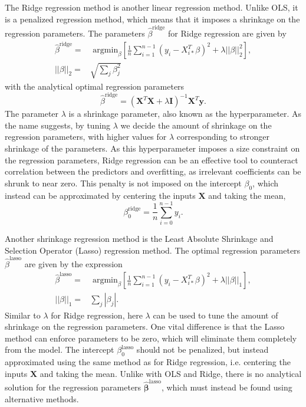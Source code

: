 \documentclass[a4paper, 10pt]{article}
\begin{document}
\begin{multicols}{2}
The Ridge regression method is another linear regression method. Unlike OLS, it is a penalized regression method, which means that it imposes a shrinkage on the regression parameters. The parameters $\hat{\beta}^\text{ridge}$ for Ridge regression are given by
\begin{align}
    \hat{\beta}^\text{ridge} = &\text{ argmin}_\beta \left[ \frac{1}{n}\sum_{i=1}^{n-1}(y_i-X_{i*}^T\beta)^2 + \lambda ||\beta||_2^2  \right],
    \label{eq:argminbeta_ridge}\\
        ||\beta||_2 =&  \sqrt{\sum_j \beta_j^2}
\end{align}
with the analytical optimal regression parameters
\begin{equation}
    \hat{\beta}^\text{ridge} = (\bm{X}^T\bm{X} +\lambda \bm{I})^{-1} \bm{X}^T \bm{y}.
    \label{eq:beta_ridge}
\end{equation}
The parameter $\lambda$ is a shrinkage parameter, also known as the hyperparameter. As the name suggests, by tuning $\lambda$ we decide the amount of shrinkage on the regression parameters, with higher values for $\lambda$ corresponding to stronger shrinkage of the parameters. As this hyperparameter imposes a size constraint on the regression parameters, Ridge regression can be an effective tool to counteract correlation between the predictors and overfitting, as irrelevant coefficients can be shrunk to near zero. This penalty is not imposed on the intercept $\beta_0$, which instead can be approximated by centering the inputs $\bm{X}$ and taking the mean,
\begin{equation}
	\beta_0^\text{ridge}=\frac{1}{n}\sum_{i=0}^{n-1}y_i.
	\label{eq:beta0_Ridge}
\end{equation}

Another shrinkage regression method is the  Least Absolute Shrinkage and Selection Operator (Lasso) regression method. The optimal regression parameters $\hat{\beta}^\text{lasso}$ are  given by the expression
\begin{align}
    \hat{\beta}^\text{lasso} =&  \text{ argmin}_\beta \left[  \frac{1}{n}\sum_{i=1}^{n-1}(y_i-X_{i*}^T\beta)^2 + \lambda ||\beta||_1  \right],
    \label{eq:argminbeta_lasso}\\
    ||\beta||_1 =& \sum_j |\beta_j|.
\end{align}
Similar to $\lambda$ for Ridge regression, here $\lambda$ can be used to tune the amount of shrinkage on the regression parameters. One vital difference is that the Lasso method can enforce parameters to be zero, which will eliminate them completely from the model.  The intercept $\beta_0^\text{lasso}$ should not be penalized, but instead approximated using the same method as for Ridge regression, i.e. centering the inputs $\bm{X}$ and taking the mean. Unlike with OLS and Ridge, there is no analytical solution for the regression parameters $\bm{\hat{\beta}}^\text{lasso}$, which must instead be found using alternative methods.


\end{multicols}
\end{document}
